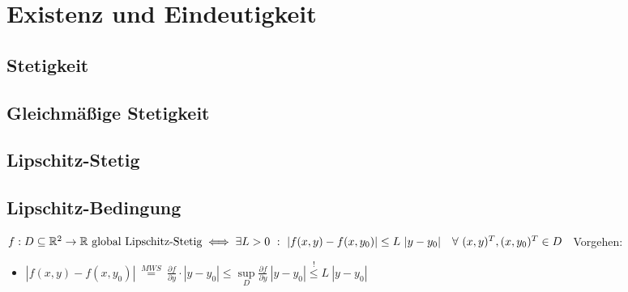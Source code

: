 
\section{Existenz und Eindeutigkeit}
\subsection{Stetigkeit}
\subsection{Gleichmäßige Stetigkeit}
\subsection{Lipschitz-Stetig}
\label{subsec:l-stetig}
\subsection{Lipschitz-Bedingung}

 $f:D \subseteq \mathbb{R}^2 \to \mathbb{R} \ \text{global Lipschitz-Stetig} \\
 \iff \exists L>0 \ : \ |f(x,y)-f(x,y_0)| \leq  L \ |y-y_0| \quad \forall \ (x,y)^T,(x,y_0)^T \in D$ \
 Vorgehen:
 \begin{itemize}
     \item $|f(x,y)-f(x,y_0)| \ \overset{MWS}= \ \frac{\partial f}{\partial y} \cdot |y-y_0| \leq \sup\limits_{D} \frac{\partial f}{\partial y} \ |y-y_0| \stackrel{!}{\leq} L\ |y-y_0| $
 \end{itemize}

